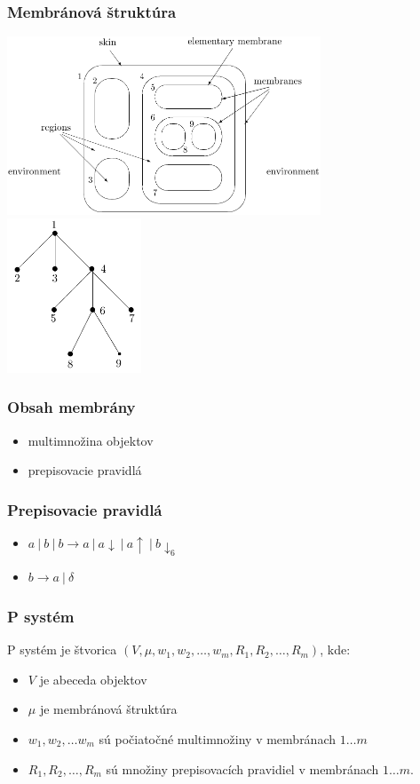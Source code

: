 \documentclass{beamer}
\begin{document}
\begin{frame}[t]\frametitle{Membránová štruktúra}
\includegraphics[width=0.7\textwidth]{membrane_structure.png}
\hfill
\includegraphics[width=0.3\textwidth]{membrane_tree.png}
\end{frame}

\begin{frame}[t]\frametitle{Obsah membrány}
\begin{itemize}
  \item multimnožina objektov
  \item prepisovacie pravidlá
\end{itemize}
\end{frame}

\begin{frame}[t]\frametitle{Prepisovacie pravidlá}
\begin{itemize}
  \item $a\ |\ b\ |\ b\rightarrow a\ |\ a\downarrow\ |\ a\uparrow\ |\ b\downarrow_6$
  \item $b \rightarrow a\ |\ \delta$
\end{itemize}
\end{frame}

\begin{frame}[t]\frametitle{P systém}

P systém je štvorica $(V, \mu, w_1, w_2,\dots , w_m, R_1, R_2, \dots , R_m)$, kde:
\begin{itemize}
  \item $V$ je abeceda objektov
  \item $\mu$ je membránová štruktúra
  \item $w_1, w_2, \dots w_m$ sú počiatočné multimnožiny v membránach $1\dots m$
  \item $R_1, R_2, \dots , R_m$ sú množiny prepisovacích pravidiel v membránach $1\dots m$.
\end{itemize}

\end{frame}
\end{document}
